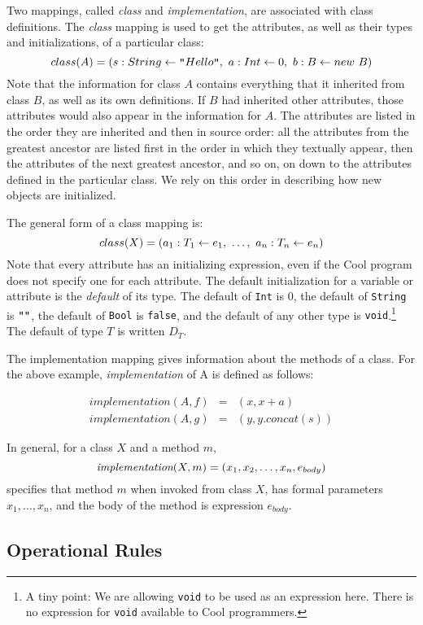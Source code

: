 Two mappings, called {\em class} and {\em implementation}, are associated 
with class definitions.  The {\em class} mapping is
used to get the attributes, as well as their types and initializations, of a
particular class:
\[
	class(A) = (s : String \leftarrow \mbox{\tt "} Hello \mbox{\tt "},\ a : Int
\leftarrow 0,\ b : B \leftarrow new\ B)
\]
Note that the information for class $A$ contains everything that it
inherited from class $B$, as well as its own definitions. If $B$ had
inherited other attributes, those attributes would also appear in the information
for $A$. The attributes are listed in the order they are inherited
and then in source order:
all the attributes from the greatest ancestor are listed first in the
order in which they textually appear, then the attributes of the next greatest
ancestor, and so on, on down to the attributes defined in the particular class.
We rely on this order in describing how new objects are initialized.

The general form of a class mapping is:
\[
	\classmap{X}{\attr{a_1}{T_1}{e_1},\ \ldots,\ \attr{a_n}{T_n}{e_n}}
\]
Note that every attribute has an initializing expression, even if the
Cool program does not specify one for each attribute. The default
initialization for a variable or attribute is the {\em default} of
its type.  The default of {\tt Int} is 0, the default of {\tt String} 
is $\mbox{\tt "}\mbox{\tt "}$, the default of {\tt Bool} is {\tt false}, and the default
of any other type is {\tt void}.\footnote{A tiny point: We are
allowing {\tt void} to be used as an expression here.  There is no
expression for {\tt void} available to Cool programmers.}
The default of type $T$ is 
written $D_T$.

The implementation mapping gives information about the methods of
a class. For the above example, {\em implementation} of A  is defined as
follows:

\[
\begin{array}{rcl}
	implementation(A,f) & = & (x, x+a) \\
	implementation(A,g) & = & (y, y.concat(s))
\end{array}
\]

In general, for a class $X$ and a method $m$,
\[
	\mbox{\em implementation}(X,m) = (x_1, x_2, \ldots, x_n, e_{body})
\]
specifies that method $m$ when invoked from class $X$, has formal
parameters $x_1, \ldots, x_n$, and the body of the method is expression
$e_{body}$.

\subsection{Operational Rules}

